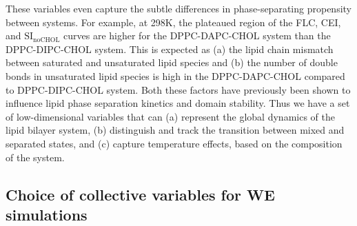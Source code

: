 \documentclass{biophys-new}
\begin{document}
These variables even capture the subtle differences in phase-separating propensity between systems.
For example, at 298K, the plateaued region of the FLC, CEI, and $\text{SI}_{\text{noCHOL}}$ curves are higher for the DPPC-DAPC-CHOL system than the DPPC-DIPC-CHOL system.
This is expected as (a) the lipid chain mismatch between saturated and unsaturated lipid species and (b) the number of double bonds in unsaturated lipid species is high in the DPPC-DAPC-CHOL compared to DPPC-DIPC-CHOL system.
Both these factors have previously been shown to influence lipid phase separation kinetics and domain stability\cite{Fowler2016, Lin2016}.
Thus we have a set of low-dimensional variables that can (a) represent the global dynamics of the lipid bilayer system,
(b) distinguish and track the transition between mixed and separated states, and (c) capture temperature effects,
based on the composition of the system.

\subsection*{Choice of collective variables for WE simulations}
\end{document}
